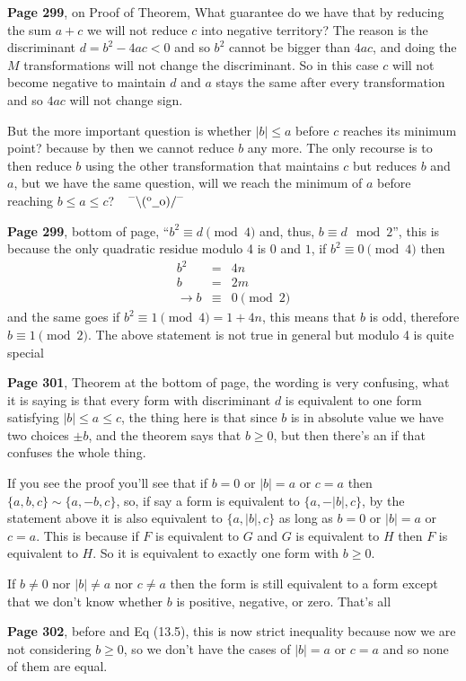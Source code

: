 \documentclass[aps,preprint,preprintnumbers,nofootinbib,showpacs,prd]{revtex4-1}
\newcommand{\nbea}{\begin{eqnarray*}}
\newcommand{\neea}{\end{eqnarray*}}
\newcommand{\dunno}{$ {}^{\mbox {--}}\backslash(^{\rm o}{}\underline{\hspace{0.2cm}}{\rm o})/^{\mbox {--}}$}
\begin{document}
{\bf Page 299}, on Proof of Theorem, What guarantee do we have that by reducing the sum $a+c$ we will not reduce $c$ into negative territory? The reason is the discriminant $d = b^2 - 4ac < 0$ and so $b^2$ cannot be bigger than $4ac$, and doing the $M$ transformations will not change the discriminant. So in this case $c$ will not become negative to maintain $d$ and $a$ stays the same after every transformation and so $4ac$ will not change sign.

But the more important question is whether $|b| \le a$ before $c$ reaches its minimum point? because by then we cannot reduce $b$ any more. The only recourse is to then reduce $b$ using the other transformation that maintains $c$ but reduces $b$ and $a$, but we have the same question, will we reach the minimum of $a$ before reaching $b \le a \le c$? ~ \dunno

{\bf Page 299}, bottom of page, ``$b^2\equiv d \pmod{4}$ and, thus, $b\equiv d\mod2$'', this is because the only quadratic residue modulo 4 is $0$ and $1$, if $b^2 \equiv 0 \pmod{4}$ then
%
\nbea
b^2 & = & 4n \\
b & = & 2m \\
\to b & \equiv & 0 \pmod{2}
\neea
%
and the same goes if $b^2\equiv 1 \pmod{4} = 1  + 4n$, this means that $b$ is odd, therefore $b \equiv 1\pmod{2}$. The above statement is not true in general but modulo 4 is quite special

{\bf Page 301}, Theorem at the bottom of page, the wording is very confusing, what it is saying is that every form with discriminant $d$ is equivalent to one form satisfying $|b| \le a \le c$, the thing here is that since $b$ is in absolute value we have two choices $\pm b$, and the theorem says that $b \ge 0$, but then there's an if that confuses the whole thing.

If you see the proof you'll see that if $b=0$ or $|b|=a$ or $c=a$ then $\{a,b,c\} \sim \{a,-b,c\}$, so, if say a form is equivalent to $\{a,-|b|,c\}$, by the statement above it is also equivalent to $\{a,|b|,c\}$ as long as $b=0$ or $|b|=a$ or $c=a$. This is because if $F$ is equivalent to $G$ and $G$ is equivalent to $H$ then $F$ is equivalent to $H$. So it is equivalent to exactly one form with $b\ge 0$.

If $b\neq0$ nor $|b|\neq a$ nor $c\neq a$ then the form is still equivalent to a form except that we don't know whether $b$ is positive, negative, or zero. That's all

{\bf Page 302}, before and Eq (13.5), this is now strict inequality because now we are not considering $b\ge 0$, so we don't have the cases of $|b|=a$ or $c=a$ and so none of them are equal.
\end{document}
